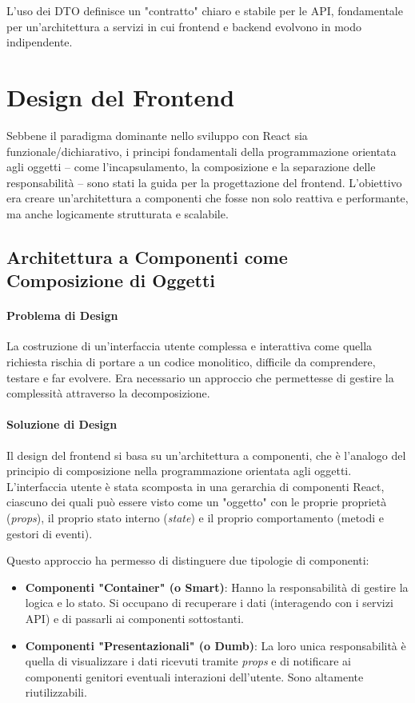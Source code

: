 \documentclass[12pt,a4paper,openright,twoside]{book}
\begin{document}
L'uso dei DTO definisce un "contratto" chiaro e stabile per le API, fondamentale per un'architettura a servizi in cui frontend e backend evolvono in modo indipendente.

\section{Design del Frontend}
\label{sec:design_frontend}

Sebbene il paradigma dominante nello sviluppo con React sia funzionale/dichiarativo, i principi fondamentali della programmazione orientata agli oggetti -- come l'incapsulamento, la composizione e la separazione delle responsabilità -- sono stati la guida per la progettazione del frontend. L'obiettivo era creare un'architettura a componenti che fosse non solo reattiva e performante, ma anche logicamente strutturata e scalabile.

\subsection{Architettura a Componenti come Composizione di Oggetti}
\label{subsec:design_component_composition}

\paragraph{Problema di Design}
La costruzione di un'interfaccia utente complessa e interattiva come quella richiesta rischia di portare a un codice monolitico, difficile da comprendere, testare e far evolvere. Era necessario un approccio che permettesse di gestire la complessità attraverso la decomposizione.

\paragraph{Soluzione di Design}
Il design del frontend si basa su un'architettura a componenti, che è l'analogo del principio di composizione nella programmazione orientata agli oggetti. L'interfaccia utente è stata scomposta in una gerarchia di componenti React, ciascuno dei quali può essere visto come un "oggetto" con le proprie proprietà (\textit{props}), il proprio stato interno (\textit{state}) e il proprio comportamento (metodi e gestori di eventi).

Questo approccio ha permesso di distinguere due tipologie di componenti:
\begin{itemize}
    \item \textbf{Componenti "Container" (o Smart)}: Hanno la responsabilità di gestire la logica e lo stato. Si occupano di recuperare i dati (interagendo con i servizi API) e di passarli ai componenti sottostanti.
    \item \textbf{Componenti "Presentazionali" (o Dumb)}: La loro unica responsabilità è quella di visualizzare i dati ricevuti tramite \textit{props} e di notificare ai componenti genitori eventuali interazioni dell'utente. Sono altamente riutilizzabili.
\end{itemize}
\end{document}
